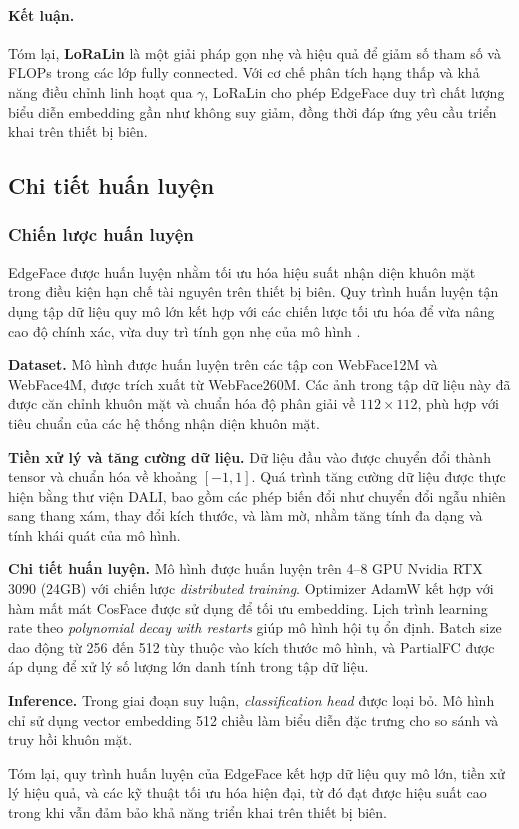 \paragraph{Kết luận.} 
Tóm lại, \textbf{LoRaLin} là một giải pháp gọn nhẹ và hiệu quả để giảm số tham số và FLOPs trong các lớp fully connected. Với cơ chế phân tích hạng thấp và khả năng điều chỉnh linh hoạt qua $\gamma$, LoRaLin cho phép EdgeFace duy trì chất lượng biểu diễn embedding gần như không suy giảm, đồng thời đáp ứng yêu cầu triển khai trên thiết bị biên.

\subsection{Chi tiết huấn luyện}
\subsubsection{Chiến lược huấn luyện}

EdgeFace được huấn luyện nhằm tối ưu hóa hiệu suất nhận diện khuôn mặt trong điều kiện hạn chế tài nguyên trên thiết bị biên. 
Quy trình huấn luyện tận dụng tập dữ liệu quy mô lớn kết hợp với các chiến lược tối ưu hóa để vừa nâng cao độ chính xác, vừa duy trì tính gọn nhẹ của mô hình \cite{george2024edgeface}.

\textbf{Dataset.} Mô hình được huấn luyện trên các tập con WebFace12M và WebFace4M, được trích xuất từ WebFace260M. 
Các ảnh trong tập dữ liệu này đã được căn chỉnh khuôn mặt và chuẩn hóa độ phân giải về $112\times112$, phù hợp với tiêu chuẩn của các hệ thống nhận diện khuôn mặt.

\textbf{Tiền xử lý và tăng cường dữ liệu.} Dữ liệu đầu vào được chuyển đổi thành tensor và chuẩn hóa về khoảng $[-1,1]$. 
Quá trình tăng cường dữ liệu được thực hiện bằng thư viện DALI, bao gồm các phép biến đổi như chuyển đổi ngẫu nhiên sang thang xám, thay đổi kích thước, và làm mờ, nhằm tăng tính đa dạng và tính khái quát của mô hình.

\textbf{Chi tiết huấn luyện.} Mô hình được huấn luyện trên 4--8 GPU Nvidia RTX 3090 (24GB) với chiến lược \textit{distributed training}. 
Optimizer AdamW kết hợp với hàm mất mát CosFace được sử dụng để tối ưu embedding. 
Lịch trình learning rate theo \textit{polynomial decay with restarts} giúp mô hình hội tụ ổn định. 
Batch size dao động từ 256 đến 512 tùy thuộc vào kích thước mô hình, và PartialFC được áp dụng để xử lý số lượng lớn danh tính trong tập dữ liệu.

\textbf{Inference.} Trong giai đoạn suy luận, \textit{classification head} được loại bỏ. 
Mô hình chỉ sử dụng vector embedding 512 chiều làm biểu diễn đặc trưng cho so sánh và truy hồi khuôn mặt.

Tóm lại, quy trình huấn luyện của EdgeFace kết hợp dữ liệu quy mô lớn, tiền xử lý hiệu quả, và các kỹ thuật tối ưu hóa hiện đại, từ đó đạt được hiệu suất cao trong khi vẫn đảm bảo khả năng triển khai trên thiết bị biên.

